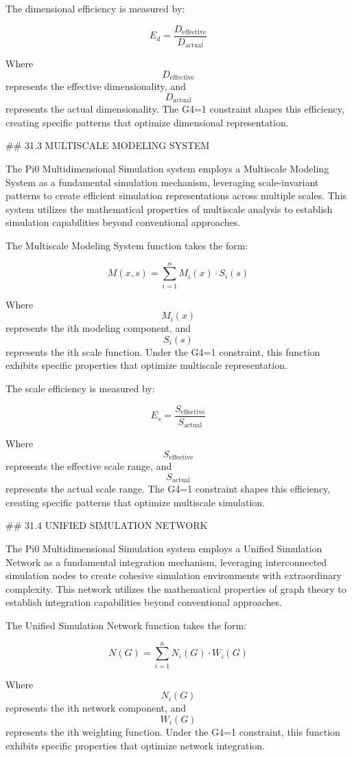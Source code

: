 The dimensional efficiency is measured by:

$$ E_d = \frac{D_{\text{effective}}}{D_{\text{actual}}} $$

Where $$ D_{\text{effective}} $$ represents the effective dimensionality, and $$ D_{\text{actual}} $$ represents the actual dimensionality. The G4=1 constraint shapes this efficiency, creating specific patterns that optimize dimensional representation.

## 31.3 MULTISCALE MODELING SYSTEM

The Pi0 Multidimensional Simulation system employs a Multiscale Modeling System as a fundamental simulation mechanism, leveraging scale-invariant patterns to create efficient simulation representations across multiple scales. This system utilizes the mathematical properties of multiscale analysis to establish simulation capabilities beyond conventional approaches.

The Multiscale Modeling System function takes the form:

$$ M(x, s) = \sum_{i=1}^{n} M_i(x) \cdot S_i(s) $$

Where $$ M_i(x) $$ represents the ith modeling component, and $$ S_i(s) $$ represents the ith scale function. Under the G4=1 constraint, this function exhibits specific properties that optimize multiscale representation.

The scale efficiency is measured by:

$$ E_s = \frac{S_{\text{effective}}}{S_{\text{actual}}} $$

Where $$ S_{\text{effective}} $$ represents the effective scale range, and $$ S_{\text{actual}} $$ represents the actual scale range. The G4=1 constraint shapes this efficiency, creating specific patterns that optimize multiscale simulation.

## 31.4 UNIFIED SIMULATION NETWORK

The Pi0 Multidimensional Simulation system employs a Unified Simulation Network as a fundamental integration mechanism, leveraging interconnected simulation nodes to create cohesive simulation environments with extraordinary complexity. This network utilizes the mathematical properties of graph theory to establish integration capabilities beyond conventional approaches.

The Unified Simulation Network function takes the form:

$$ N(G) = \sum_{i=1}^{n} N_i(G) \cdot W_i(G) $$

Where $$ N_i(G) $$ represents the ith network component, and $$ W_i(G) $$ represents the ith weighting function. Under the G4=1 constraint, this function exhibits specific properties that optimize network integration.

